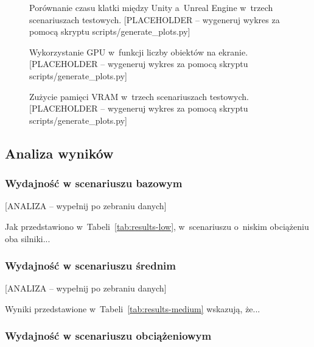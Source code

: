 \begin{figure}[h!]
    \centering
    \caption{Porównanie czasu klatki między Unity a~Unreal Engine w~trzech scenariuszach testowych. [PLACEHOLDER -- wygeneruj wykres za pomocą skryptu scripts/generate\_plots.py]}
    \label{fig:frame-time-comparison}
\end{figure}

\begin{figure}[h!]
    \centering
    \caption{Wykorzystanie GPU w~funkcji liczby obiektów na ekranie. [PLACEHOLDER -- wygeneruj wykres za pomocą skryptu scripts/generate\_plots.py]}
    \label{fig:gpu-utilization}
\end{figure}

\begin{figure}[h!]
    \centering
    \caption{Zużycie pamięci VRAM w~trzech scenariuszach testowych. [PLACEHOLDER -- wygeneruj wykres za pomocą skryptu scripts/generate\_plots.py]}
    \label{fig:memory-usage}
\end{figure}

\subsection{Analiza wyników}

\subsubsection{Wydajność w scenariuszu bazowym}

[ANALIZA -- wypełnij po zebraniu danych]

Jak przedstawiono w~Tabeli~\ref{tab:results-low}, w~scenariuszu o~niskim obciążeniu oba silniki...

\subsubsection{Wydajność w scenariuszu średnim}

[ANALIZA -- wypełnij po zebraniu danych]

Wyniki przedstawione w~Tabeli~\ref{tab:results-medium} wskazują, że...

\subsubsection{Wydajność w scenariuszu obciążeniowym}

